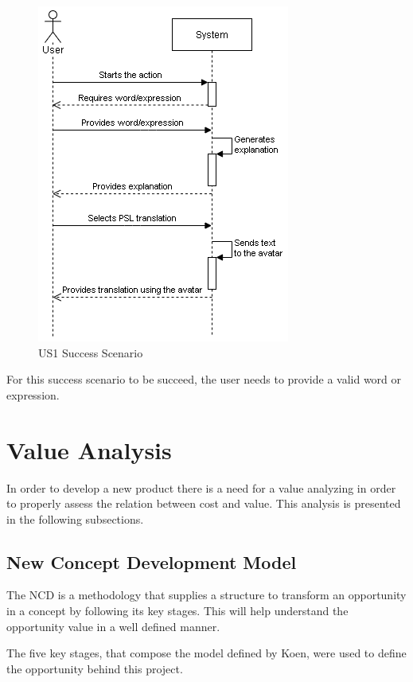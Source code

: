 \begin{figure}[H]
\centering
\includegraphics[scale=0.65]{ch3/assets/ssd.png}
\caption[US1 Success Scenario]{US1 Success Scenario}
\label{fig:ssd1}
\end{figure}

For this success scenario to be succeed, the user needs to provide a valid word or expression.

\section{Value Analysis}

In order to develop a new product there is a need for a value analyzing in order to properly assess the relation between cost and value.
This analysis is presented in the following subsections.

\subsection{New Concept Development Model}

The \gls{NCD}\cite{koen2001providing} is a methodology that supplies a structure to transform an opportunity in a concept by following its key stages.
This will help understand the opportunity value in a well defined manner.

The five key stages, that compose the model defined by Koen\cite{koen2001providing}, were used to define the opportunity behind this project.

